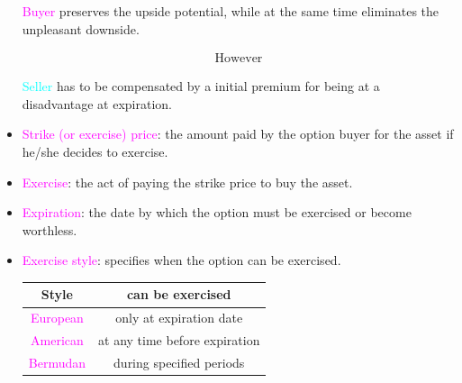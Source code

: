 \begin{frame}[fragile]
\begin{center}
	\begin{minipage}{0.8\textwidth}
		\begin{itemize}
			\item[\textcolor{magenta}{Buyer}] preserves the upside potential, while at the same time eliminates the unpleasant
				downside.
				\bigskip

				\begin{align*}
					\text{However}
				\end{align*}
				\bigskip

			\item[\textcolor{cyan}{Seller}] has to be compensated by a initial premium for being at a disadvantage at
				expiration.
		\end{itemize}
	\end{minipage}
\end{center}
\end{frame}
\begin{frame}[fragile,t]
	\begin{itemize}
		\item \textcolor{magenta}{Strike (or exercise) price}: the amount paid by the option buyer for the asset if he/she decides to exercise.
			\bigskip
		\item \textcolor{magenta}{Exercise}: the act of paying the strike price to buy the asset.
			\bigskip
		\item \textcolor{magenta}{Expiration}: the date by which the option must be exercised or become worthless.
			\bigskip
		\item \textcolor{magenta}{Exercise style}: specifies when the option can be exercised.
			\bigskip
			\begin{center}
				\renewcommand{\arraystretch}{1.2}
				\begin{tabular}{|c|c|}
					\hline
					Style                         & can be exercised              \\ \hline
					\textcolor{magenta}{European} & only at expiration date       \\
					\textcolor{magenta}{American} & at any time before expiration \\
					\textcolor{magenta}{Bermudan} & during specified periods      \\ \hline
				\end{tabular}

			\end{center}
	\end{itemize}
\end{frame}
